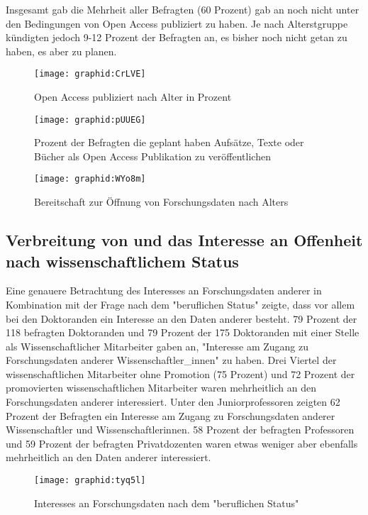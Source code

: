 Insgesamt gab die Mehrheit aller Befragten (60 Prozent) gab an noch nicht unter den Bedingungen von Open Access publiziert zu haben. Je nach Alterstgruppe kündigten jedoch 9-12 Prozent der Befragten an, es bisher noch nicht getan zu haben, es aber zu planen.

\begin{figure}[h!]
\texttt{[image: graphid:CrLVE]}
\caption{Open Access publiziert nach Alter in Prozent}
\end{figure}

\begin{figure}[h!]
\texttt{[image: graphid:pUUEG]}
\caption{Prozent der Befragten die geplant haben Aufsätze, Texte oder Bücher als Open Access Publikation zu veröffentlichen}
\end{figure}

\begin{figure}[h!]
\texttt{[image: graphid:WYo8m]}
\caption{Bereitschaft zur Öffnung von Forschungsdaten nach Alters}
\end{figure}

\subsection{Verbreitung von und das Interesse an Offenheit nach wissenschaftlichem Status }

Eine genauere Betrachtung des Interesses an Forschungsdaten anderer in Kombination mit der Frage nach dem "beruflichen Status" zeigte, dass vor allem bei den Doktoranden ein Interesse an den Daten anderer besteht. 79 Prozent der 118 befragten Doktoranden und 79 Prozent der 175 Doktoranden mit einer Stelle als Wissenschaftlicher Mitarbeiter gaben an, "Interesse am Zugang zu Forschungsdaten anderer Wissenschaftler_innen" zu haben. Drei Viertel der wissenschaftlichen Mitarbeiter ohne Promotion (75 Prozent) und 72 Prozent der promovierten wissenschaftlichen Mitarbeiter waren mehrheitlich an den Forschungsdaten anderer interessiert. Unter den Juniorprofessoren zeigten 62 Prozent der Befragten ein Interesse am Zugang zu Forschungsdaten anderer Wissenschaftler und Wissenschaftlerinnen. 58 Prozent der befragten Professoren und 59 Prozent der befragten Privatdozenten waren etwas weniger aber ebenfalls mehrheitlich an den Daten anderer interessiert.

\begin{figure}[h!]
\texttt{[image: graphid:tyq5l]}
\caption{Interesses an Forschungsdaten nach dem "beruflichen Status"}
\end{figure}

